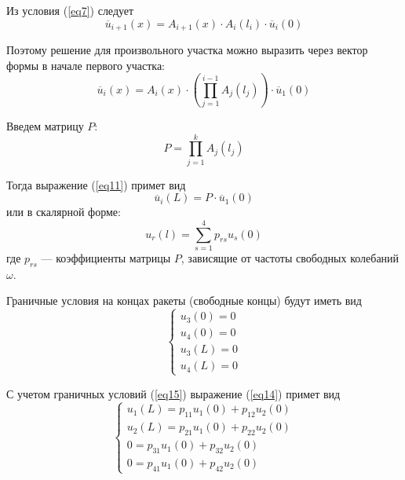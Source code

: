 Из условия (\ref{eq7}) следует
\begin{equation}
    \label{eq10}
    \overline{u}_{i+1}(x) = A_{i+1}(x) \cdot A_i(l_i) \cdot\overline{u}_i(0)
\end{equation}

Поэтому решение для произвольного участка можно выразить через вектор формы в начале первого участка:
\begin{equation}
    \label{eq11}
    \overline{u}_i(x) = A_i(x) \cdot \left( \prod_{j=1}^{i-1} A_j(l_j) \right) \cdot \overline{u}_1(0)
\end{equation}

Введем матрицу $P$:
\begin{equation}
    \label{eq12}
    P = \prod_{j=1}^{k} A_j(l_j)
\end{equation}

Тогда выражение (\ref{eq11}) примет вид
\begin{equation}
    \label{eq13}
    \overline{u}_i(L) = P \cdot \overline{u}_1(0)
\end{equation}
или в скалярной форме:
\begin{equation}
    \label{eq14}
    u_r(l) = \sum_{s=1}^{4} p_{rs} u_s(0)
\end{equation}
где $p_{rs}$ --- коэффициенты матрицы $P$, зависящие от частоты свободных колебаний $\omega$.

Граничные условия на концах ракеты (свободные концы) будут иметь вид
\begin{equation}
    \label{eq15}
    \begin{cases}
        u_3(0) = 0
        \\
        u_4(0) = 0
        \\
        u_3(L) = 0
        \\
        u_4(L) = 0
    \end{cases}
\end{equation}

С учетом граничных условий (\ref{eq15}) выражение (\ref{eq14}) примет вид
\begin{equation}
    \label{eq16}
    \begin{cases}
        u_1(L) = p_{11} u_1(0) + p_{12} u_2(0)
        \\
        u_2(L) = p_{21} u_1(0) + p_{22} u_2(0)
        \\
        0 = p_{31} u_1(0) + p_{32} u_2(0)
        \\
        0 = p_{41} u_1(0) + p_{42} u_2(0)
    \end{cases}
\end{equation}

